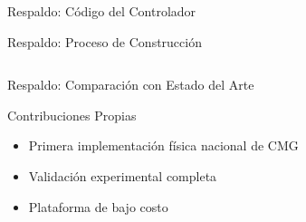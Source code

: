 \documentclass[10pt,xcolor={dvipsnames}]{beamer}
\begin{document}
\begin{frame}{Respaldo: Código del Controlador}
\begin{center}
\end{center}
\end{frame}

\begin{frame}{Respaldo: Proceso de Construcción}
\begin{columns}

\vspace{0.3cm}


\vspace{0.3cm}
\end{columns}
\end{frame}

\begin{frame}{Respaldo: Comparación con Estado del Arte}
\begin{center}
\end{center}

\vspace{0.3cm}
\begin{block}{Contribuciones Propias}
\begin{itemize}
    \item Primera implementación física nacional de CMG
    \item Validación experimental completa
    \item Plataforma de bajo costo
\end{itemize}
\end{block}
\end{frame}
\end{document}
